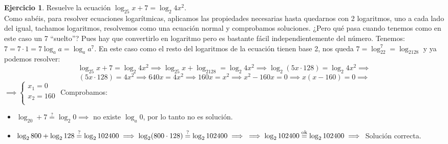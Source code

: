 \documentclass[11pt, oneside]{book}
\theoremstyle{definition} %
\newtheorem{ejercicio}{Ejercicio}
\newcommand{\doubleleft}[2]{ \left\{\begin{array}{ll}	#1 \\	#2 \\  \end{array}	\right. }
\begin{document}
\begin{ejercicio} Resuelve la ecuación $\log_25x + 7 = \log_2 4x^2$.\\

Como sabéis, para resolver ecuaciones logarítmicas, aplicamos las propiedades necesarias hasta quedarnos con 2 logaritmos, uno a cada lado del igual, tachamos logaritmos, resolvemos como una ecuación normal y comprobamos soluciones. ¿Pero qué pasa cuando tenemos como en este caso un 7 ``suelto''? Pues hay que convertirlo en logaritmo pero es bastante fácil independientemente del número. Tenemos:\\
$7=7\cdot1= 7\log_aa=\log_aa^7$. En este caso como el resto del logaritmos de la ecuación tienen base 2, nos queda $7=\log_22^7=\log_2128$ y ya podemos resolver:
\[\log_25x + 7 = \log_2 4x^2\implies\log_25x + \log_2128 = \log_2 4x^2\implies\log_2(5x\cdot128) = \log_2 4x^2\implies\]
\[(5x\cdot128) =4x^2\implies 640x=4x^2\implies 160x=x^2\implies x^2-160x=0\implies x(x-160)=0\implies\]
$\implies\doubleleft{x_1=0}{x_2=160}$ Comprobamos:
\begin{itemize}
\item$\log_20 + 7 \overset{?}= \log_2 0\implies$ no existe $\log_a0$, por lo tanto no es solución.
\item$\log_2800 + \log_2128 \overset{?}= \log_2 102400\implies \log_2(800\cdot128) \overset{?}= \log_2 102400\implies\\\implies\log_2 102400 \overset{\mathrm{ok}}= \log_2 102400\implies$ Solución correcta.
\end{itemize}

\end{ejercicio}
\end{document}
